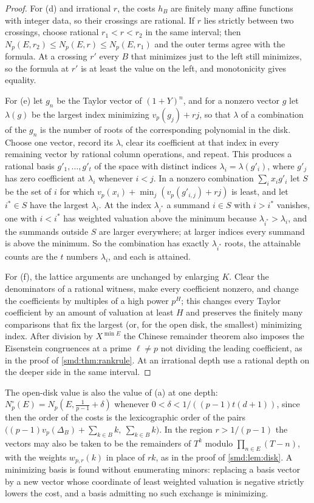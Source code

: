 \begin{proof}
For (d) and irrational $r$, the costs $h_B$ are finitely many affine functions with integer
data, so their crossings are rational. If $r$ lies strictly between two crossings, choose
rational $r_1<r<r_2$ in the same interval; then $N_p(E,r_2)\le N_p(E,r)\le N_p(E,r_1)$ and the
outer terms agree with the formula. At a crossing $r'$ every $B$ that minimizes just to the
left still minimizes, so the formula at $r'$ is at least the value on the left, and
monotonicity gives equality.

For (e) let $g_n$ be the Taylor vector of $(1+Y)^n$, and for a nonzero vector $g$ let
$\lambda(g)$ be the largest index minimizing $v_p(g_j)+rj$, so that $\lambda$ of a combination
of the $g_n$ is the number of roots of the corresponding polynomial in the disk. Choose one
vector, record its $\lambda$, clear its coefficient at that index in every remaining vector by
rational column operations, and repeat. This produces a rational basis $g'_1,\dots,g'_t$ of the
space with distinct indices $\lambda_i=\lambda(g'_i)$, where $g'_j$ has zero coefficient at
$\lambda_i$ whenever $i<j$. In a nonzero combination $\sum_ix_ig'_i$ let $S$ be the set of $i$
for which $v_p(x_i)+\min_j(v_p(g'_{i,j})+rj)$ is least, and let $i^*\in S$ have the largest
$\lambda_i$. At the index $\lambda_{i^*}$ a summand $i\in S$ with $i>i^*$ vanishes, one with
$i<i^*$ has weighted valuation above the minimum because $\lambda_{i^*}>\lambda_i$, and the
summands outside $S$ are larger everywhere; at larger indices every summand is above the
minimum. So the combination has exactly $\lambda_{i^*}$ roots, the attainable counts are the
$t$ numbers $\lambda_i$, and each is attained.

For (f), the lattice arguments are unchanged by enlarging $K$. Clear the denominators of a
rational witness, make every coefficient nonzero, and change the coefficients by multiples of a
high power $p^H$; this changes every Taylor coefficient by an amount of valuation at least $H$
and preserves the finitely many comparisons that fix the largest (or, for the open disk, the
smallest) minimizing index. After division by $X^{\min E}$ the Chinese remainder theorem also
imposes the Eisenstein congruences at a prime $\ell\ne p$ not dividing the leading coefficient,
as in the proof of \cref{smd:thm:rankrule}. At an irrational depth use a rational depth on the
deeper side in the same interval.
\end{proof}

The open-disk value is also the value of (a) at one depth:
$N^\circ_p(E)=N_p(E,\frac1{p-1}+\delta)$ whenever $0<\delta<1/((p-1)t(d+1))$, since then the
order of the costs is the lexicographic order of the pairs
$\bigl((p-1)v_p(\Delta_B)+\sum_{k\in B}k,\ \sum_{k\in B}k\bigr)$. In the region $r>1/(p-1)$ the
vectors may also be taken to be the remainders of $T^k$ modulo $\prod_{n\in E}(T-n)$, with the
weights $w_{p,r}(k)$ in place of $rk$, as in the proof of \cref{smd:lem:disk}. A minimizing
basis is found without enumerating minors: replacing a basis vector by a new vector whose
coordinate of least weighted valuation is negative strictly lowers the cost, and a basis
admitting no such exchange is minimizing.

